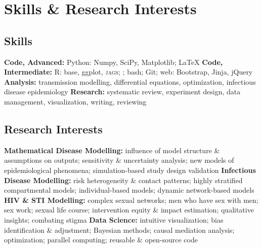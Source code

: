 \section{Skills \& Research Interests}\nodate
\subsection{Skills}
\bullet \textbf{Code, Advanced:} Python: Numpy, SciPy, Matplotlib; \LaTeX
\bullet \textbf{Code, Intermediate:} R: base, ggplot, \textsc{jags}; \matlab; bash; Git; web: Bootstrap, Jinja, jQuery
\bullet \textbf{Analysis:} transmission modelling, differential equations, optimization, infectious disease epidemiology
\bullet \textbf{Research:} systematic review, experiment design, data management, visualization, writing, reviewing
\subsection{Research Interests}\nodate
\bullet \textbf{Mathematical Disease Modelling:}
        influence of model structure \& assumptions on outputs;
        sensitivity \& uncertainty analysis;
        new models of epidemiological phenomena;
        simulation-based study design validation
\bullet \textbf{Infectious Disease Modelling:}
        risk heterogeneity \& contact patterns;
        highly stratified compartmental models;
        individual-based models;
        dynamic network-based models
\bullet \textbf{HIV \& STI Modelling:}
        complex sexual networks;
        men who have sex with men;
        sex work;
        sexual life course;
        intervention equity \& impact estimation;
        qualitative insights;
        combating stigma
\bullet \textbf{Data Science:}
        intuitive visualization;
        bias identification \& adjustment;
        Bayesian methods;
        causal mediation analysis;
        optimization;
        parallel computing;
        reusable \& open-source code

